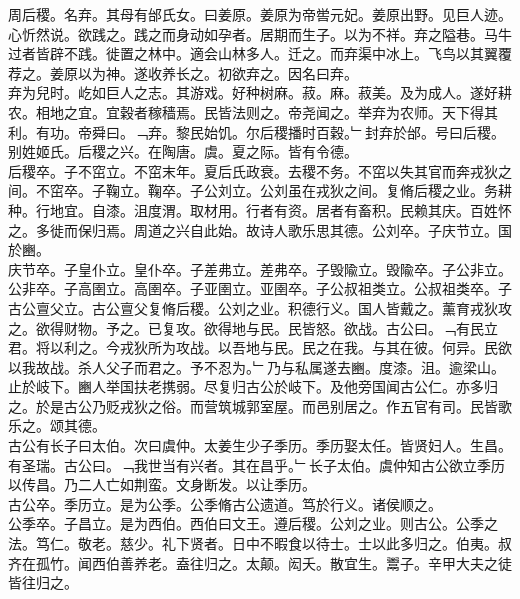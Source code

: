 \documentclass{zhvt-classic}
\begin{document}





\hspace*{2em}周后稷。名弃。其母有邰氏女。曰姜原。姜原为帝喾元妃。姜原出野。见巨人迹。心忻然说。欲践之。践之而身动如孕者。居期而生子。以为不祥。弃之隘巷。马牛过者皆辟不践。徙置之林中。適会山林多人。迁之。而弃渠中冰上。飞鸟以其翼覆荐之。姜原以为神。遂收养长之。初欲弃之。因名曰弃。\\
\hspace*{2em}弃为兒时。屹如巨人之志。其游戏。好种树麻。菽。麻。菽美。及为成人。遂好耕农。相地之宜。宜穀者稼穑焉。民皆法则之。帝尧闻之。举弃为农师。天下得其利。有功。帝舜曰。﹁弃。黎民始饥。尔后稷播时百穀。﹂封弃於邰。号曰后稷。别姓姬氏。后稷之兴。在陶唐。虞。夏之际。皆有令德。\\
\hspace*{2em}后稷卒。子不窋立。不窋末年。夏后氏政衰。去稷不务。不窋以失其官而奔戎狄之间。不窋卒。子鞠立。鞠卒。子公刘立。公刘虽在戎狄之间。复脩后稷之业。务耕种。行地宜。自漆。沮度渭。取材用。行者有资。居者有畜积。民赖其庆。百姓怀之。多徙而保归焉。周道之兴自此始。故诗人歌乐思其德。公刘卒。子庆节立。国於豳。\\
\hspace*{2em}庆节卒。子皇仆立。皇仆卒。子差弗立。差弗卒。子毁隃立。毁隃卒。子公非立。公非卒。子高圉立。高圉卒。子亚圉立。亚圉卒。子公叔祖类立。公叔祖类卒。子古公亶父立。古公亶父复脩后稷。公刘之业。积德行义。国人皆戴之。薰育戎狄攻之。欲得财物。予之。已复攻。欲得地与民。民皆怒。欲战。古公曰。﹁有民立君。将以利之。今戎狄所为攻战。以吾地与民。民之在我。与其在彼。何异。民欲以我故战。杀人父子而君之。予不忍为。﹂乃与私属遂去豳。度漆。沮。逾梁山。止於岐下。豳人举国扶老携弱。尽复归古公於岐下。及他旁国闻古公仁。亦多归之。於是古公乃贬戎狄之俗。而营筑城郭室屋。而邑别居之。作五官有司。民皆歌乐之。颂其德。\\
\hspace*{2em}古公有长子曰太伯。次曰虞仲。太姜生少子季历。季历娶太任。皆贤妇人。生昌。有圣瑞。古公曰。﹁我世当有兴者。其在昌乎。﹂长子太伯。虞仲知古公欲立季历以传昌。乃二人亡如荆蛮。文身断发。以让季历。\\
\hspace*{2em}古公卒。季历立。是为公季。公季脩古公遗道。笃於行义。诸侯顺之。\\
\hspace*{2em}公季卒。子昌立。是为西伯。西伯曰文王。遵后稷。公刘之业。则古公。公季之法。笃仁。敬老。慈少。礼下贤者。日中不暇食以待士。士以此多归之。伯夷。叔齐在孤竹。闻西伯善养老。盍往归之。太颠。闳夭。散宜生。鬻子。辛甲大夫之徒皆往归之。\\
\end{document}
